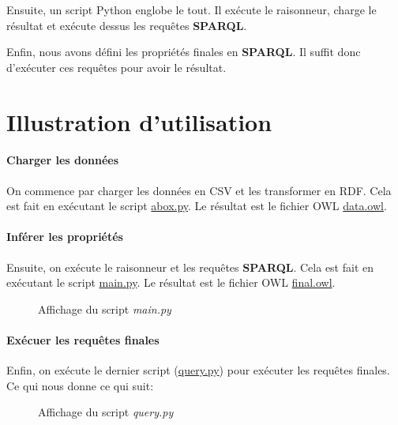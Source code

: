 \documentclass[oneside,13pt,a4paper]{article}
\begin{document}
Ensuite, un script Python englobe le tout. Il exécute le raisonneur, charge le résultat et exécute dessus les requêtes \textbf{SPARQL}.

Enfin, nous avons défini les propriétés finales en \textbf{SPARQL}. Il suffit donc d’exécuter ces requêtes pour avoir le résultat.



\section{Illustration d'utilisation}

\paragraph{Charger les données} 

On commence par charger les données en CSV et les transformer en RDF. Cela est fait en exécutant le script \href{../src/abox.py}{abox.py}. Le résultat est le fichier OWL \href{../ontologies/data.owl}{data.owl}.

\paragraph{Inférer les propriétés} 

Ensuite, on exécute le raisonneur et les requêtes \textbf{SPARQL}. Cela est fait en exécutant le script \href{../src/main.py}{main.py}. Le résultat est le fichier OWL \href{../ontologies/final.owl}{final.owl}.

\begin{figure}
  
  \caption{Affichage du script \textit{main.py}}
\end{figure}

\paragraph{Exécuer les requêtes finales}

Enfin, on exécute le dernier script (\href{../src/query.py}{query.py}) pour exécuter les requêtes finales. Ce qui nous donne ce qui suit:

\begin{figure}[!h]
  
  \caption{Affichage du script \textit{query.py}}
\end{figure}
\end{document}
